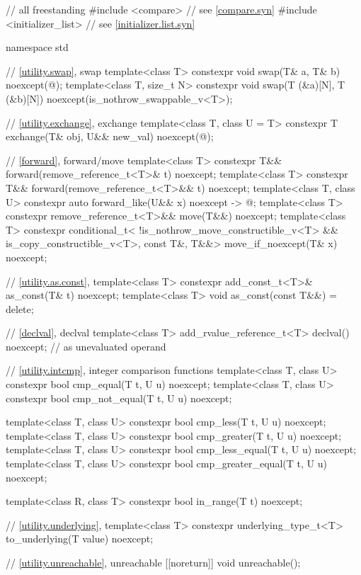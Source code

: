 \begin{codeblock}
// all freestanding
#include <compare>              // see \ref{compare.syn}
#include <initializer_list>     // see \ref{initializer.list.syn}

namespace std {
  // \ref{utility.swap}, swap
  template<class T>
    constexpr void swap(T& a, T& b) noexcept(@\seebelow@);
  template<class T, size_t N>
    constexpr void swap(T (&a)[N], T (&b)[N]) noexcept(is_nothrow_swappable_v<T>);

  // \ref{utility.exchange}, exchange
  template<class T, class U = T>
    constexpr T exchange(T& obj, U&& new_val) noexcept(@\seebelow@);

  // \ref{forward}, forward/move
  template<class T>
    constexpr T&& forward(remove_reference_t<T>& t) noexcept;
  template<class T>
    constexpr T&& forward(remove_reference_t<T>&& t) noexcept;
  template<class T, class U>
    constexpr auto forward_like(U&& x) noexcept -> @\seebelow@;
  template<class T>
    constexpr remove_reference_t<T>&& move(T&&) noexcept;
  template<class T>
    constexpr conditional_t<
        !is_nothrow_move_constructible_v<T> && is_copy_constructible_v<T>, const T&, T&&>
      move_if_noexcept(T& x) noexcept;

  // \ref{utility.as.const}, 
  template<class T>
    constexpr add_const_t<T>& as_const(T& t) noexcept;
  template<class T>
    void as_const(const T&&) = delete;

  // \ref{declval}, declval
  template<class T>
    add_rvalue_reference_t<T> declval() noexcept;   // as unevaluated operand

  // \ref{utility.intcmp}, integer comparison functions
  template<class T, class U>
    constexpr bool cmp_equal(T t, U u) noexcept;
  template<class T, class U>
    constexpr bool cmp_not_equal(T t, U u) noexcept;

  template<class T, class U>
    constexpr bool cmp_less(T t, U u) noexcept;
  template<class T, class U>
    constexpr bool cmp_greater(T t, U u) noexcept;
  template<class T, class U>
    constexpr bool cmp_less_equal(T t, U u) noexcept;
  template<class T, class U>
    constexpr bool cmp_greater_equal(T t, U u) noexcept;

  template<class R, class T>
    constexpr bool in_range(T t) noexcept;

  // \ref{utility.underlying}, 
  template<class T>
    constexpr underlying_type_t<T> to_underlying(T value) noexcept;

  // \ref{utility.unreachable}, unreachable
  [[noreturn]] void unreachable();

}
\end{codeblock}
